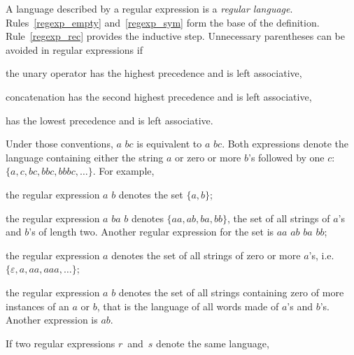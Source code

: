 A language described by a regular expression is a \emph{regular
  language}. Rules~\ref{regexp_empty} and~\ref{regexp_sym} form the
base of the definition. Rule~\ref{regexp_rec} provides the inductive
step. Unnecessary parentheses can be avoided in regular expressions if
\begin{itemize*}

  \item the unary operator \kleene{} has the highest precedence and
  is left associative,

  \item concatenation has the second highest precedence and is left
  associative,

  \item \disj{} has the lowest precedence and is left associative.

\end{itemize*}
Under those conventions, \lparen\(a\)\rparen{} \disj
\lparen\lparen\(b\)\rparen\kleene\lparen\(c\)\rparen\rparen{} is
equivalent to \(a\) \disj \(b\)\kleene\(c\). Both expressions denote
the language containing either the string \(a\) or zero or more
\(b\)'s followed by one \(c\): \(\{a, c, bc, bbc, bbbc, \dots\}\). For
example,
\begin{itemize*}

  \item the regular expression \(a\) \disj \(b\) denotes the set
    \(\{a, b\}\);

  \item the regular expression \lparen\(a\) \disj
    \(b\)\rparen\lparen\(a\) \disj \(b\)\rparen{} denotes \(\{aa, ab,
    ba, bb\}\), the set of all strings of \(a\)'s and \(b\)'s of
    length two. Another regular expression for the set is \(aa\) \disj
    \(ab\) \disj \(ba\) \disj \(bb\);

  \item the regular expression \(a\)\kleene{} denotes the set of all
    strings of zero or more \(a\)'s, i.e. \(\{\varepsilon, a, aa, aaa,
    \dots\}\);

  \item the regular expression \lparen\(a\) \disj
    \(b\)\rparen\kleene{} denotes the set of all strings containing
    zero of more instances of an \(a\) or \(b\), that is the language
    of all words made of \(a\)'s and \(b\)'s. Another expression is
    \lparen\(a\)\kleene\(b\)\kleene\rparen\kleene.

\end{itemize*}
If two regular expressions \(r\)~and~\(s\) denote the same language,
